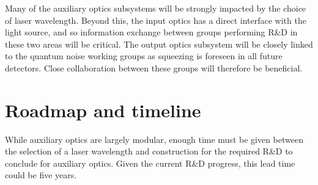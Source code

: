 Many of the auxiliary optics subsystems will be strongly impacted by the choice of laser wavelength. Beyond this, the input optics has a direct interface with the light source, and so information exchange between groups performing R\&D in these two areas will be critical.
The output optics subsystem will be closely linked to the quantum noise working groups as squeezing is foreseen in all future detectors. Close collaboration between these groups will therefore be beneficial.

\section{Roadmap and timeline}
While auxiliary optics are largely modular, enough time must be given between the selection of a laser wavelength and construction for the required R\&D to conclude for auxiliary optics. Given the current R\&D progress, this lead time could be five years. 
